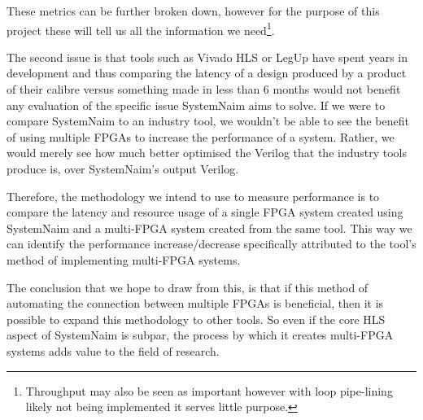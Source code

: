 These metrics can be further broken down, however for the purpose of this project these will tell us all the information we need\footnote{Throughput may also be seen as important however with loop pipe-lining likely not being implemented it serves little purpose.}.

The second issue is that tools such as Vivado HLS or LegUp have spent years in development and thus comparing the latency of a design produced by a product of their calibre versus something made in less than 6 months would not benefit any evaluation of the specific issue SystemNaim aims to solve. If we were to compare SystemNaim to an industry tool, we wouldn't be able to see the benefit of using multiple FPGAs to increase the performance of a system. Rather, we would merely see how much better optimised the Verilog that the industry tools produce is, over SystemNaim's output Verilog.

Therefore, the methodology we intend to use to measure performance is to compare the latency and resource usage of a single FPGA system created using SystemNaim and a multi-FPGA system created from the same tool. This way we can identify the performance increase/decrease specifically attributed to the tool's method of implementing multi-FPGA systems. 

The conclusion that we hope to draw from this, is that if this method of automating the connection between multiple FPGAs is beneficial, then it is possible to expand this methodology to other tools. So even if the core HLS aspect of SystemNaim is subpar, the process by which it creates multi-FPGA systems adds value to the field of research.







